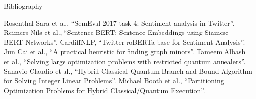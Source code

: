 \documentclass[final]{beamer}
\newlength{\colwidth}
\begin{document}
\begin{frame}[t,fragile]
\begin{columns}[t]
\begin{column}{\colwidth}
  \begin{block}{Bibliography}
    \begin{thebibliography}{10}
       Rosenthal Sara et al., ``SemEval-2017 task 4: Sentiment analysis in Twitter''.
       Reimers Nils et al., ``Sentence-BERT: Sentence Embeddings using Siamese BERT-Networks''.
       CardiffNLP, ``Twitter-roBERTa-base for Sentiment Analysis''.
       Jun Cai et al., ``A practical heuristic for finding graph minors''.
       Tameem Albash et al., ``Solving large optimization problems with restricted quantum annealers''.
       Sanavio Claudio et al., ``Hybrid Classical–Quantum Branch-and-Bound Algorithm for Solving Integer Linear Problems''.
       Michael Booth et al., ``Partitioning Optimization Problems for Hybrid Classical/Quantum Execution''.
    \end{thebibliography}
  \end{block}
\end{column}

\end{columns}
\end{frame}
\end{document}
